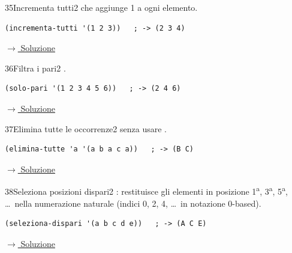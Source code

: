 \label{ex:35}
\begin{essbox}{35}{Incrementa tutti}{2}
  che aggiunge 1
a ogni elemento.
\begin{lstlisting}
(incrementa-tutti '(1 2 3))   ; -> (2 3 4)
\end{lstlisting}



\small\color{black!55}\hyperref[sol:35]{$\rightarrow$ Soluzione}\normalsize\color{black}
\end{essbox}

\label{ex:36}
\begin{stdbox}{36}{Filtra i pari}{2}
 .
\nopagebreak
\begin{lstlisting}
(solo-pari '(1 2 3 4 5 6))   ; -> (2 4 6)
\end{lstlisting}



\small\color{black!55}\hyperref[sol:36]{$\rightarrow$ Soluzione}\normalsize\color{black}
\end{stdbox}

\label{ex:37}
\begin{stdbox}{37}{Elimina tutte le occorrenze}{2}
  senza usare .
\nopagebreak
\begin{lstlisting}
(elimina-tutte 'a '(a b a c a))   ; -> (B C)
\end{lstlisting}


\small\color{black!55}\hyperref[sol:37]{$\rightarrow$ Soluzione}\normalsize\color{black}
\end{stdbox}

\label{ex:38}
\begin{colbox}{38}{Seleziona posizioni dispari}{2}
 : restituisce gli elementi
in posizione 1\textsuperscript{a}, 3\textsuperscript{a}, 5\textsuperscript{a},
\ldots\ nella numerazione naturale (indici 0, 2, 4, \ldots\ in notazione 0-based).
\begin{lstlisting}
(seleziona-dispari '(a b c d e))   ; -> (A C E)
\end{lstlisting}


\small\color{black!55}\hyperref[sol:38]{$\rightarrow$ Soluzione}\normalsize\color{black}
\end{colbox}

